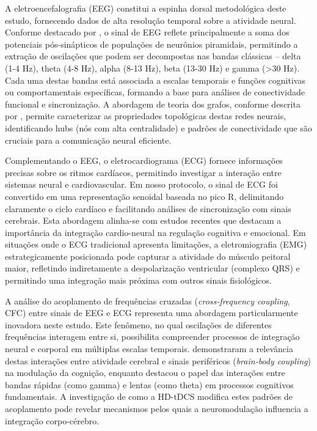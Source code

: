 A eletroencefalografia (EEG) constitui a espinha dorsal metodológica deste estudo, fornecendo dados de alta resolução temporal sobre a atividade neural. Conforme destacado por , o sinal de EEG reflete principalmente a soma dos potenciais pós-sinápticos de populações de neurônios piramidais, permitindo a extração de oscilações que podem ser decompostas nas bandas clássicas – delta (1-4 Hz), theta (4-8 Hz), alpha (8-13 Hz), beta (13-30 Hz) e gamma (>30 Hz). Cada uma destas bandas está associada a escalas temporais e funções cognitivas ou comportamentais específicas, formando a base para análises de conectividade funcional e sincronização. A abordagem de teoria dos grafos, conforme descrita por , permite caracterizar as propriedades topológicas destas redes neurais, identificando hubs (nós com alta centralidade) e padrões de conectividade que são cruciais para a comunicação neural eficiente.

Complementando o EEG, o eletrocardiograma (ECG) fornece informações precisas sobre os ritmos cardíacos, permitindo investigar a interação entre sistemas neural e cardiovascular. Em nosso protocolo, o sinal de ECG foi convertido em uma representação senoidal baseada no pico R, delimitando claramente o ciclo cardíaco e facilitando análises de sincronização com sinais cerebrais. Esta abordagem alinha-se com estudos recentes que destacam a importância da integração cardio-neural na regulação cognitiva e emocional. Em situações onde o ECG tradicional apresenta limitações, a eletromiografia (EMG) estrategicamente posicionada pode capturar a atividade do músculo peitoral maior, refletindo indiretamente a despolarização ventricular (complexo QRS) e permitindo uma integração mais próxima com outros sinais fisiológicos.

A análise do acoplamento de frequências cruzadas (\textit{cross-frequency coupling}, CFC) entre sinais de EEG e ECG representa uma abordagem particularmente inovadora neste estudo. Este fenômeno, no qual oscilações de diferentes frequências interagem entre si, possibilita compreender processos de integração neural e corporal em múltiplas escalas temporais.  demonstraram a relevância destas interações entre atividade cerebral e sinais periféricos (\textit{brain-body coupling}) na modulação da cognição, enquanto  destacou o papel das interações entre bandas rápidas (como gamma) e lentas (como theta) em processos cognitivos fundamentais. A investigação de como a HD-tDCS modifica estes padrões de acoplamento pode revelar mecanismos pelos quais a neuromodulação influencia a integração corpo-cérebro.

